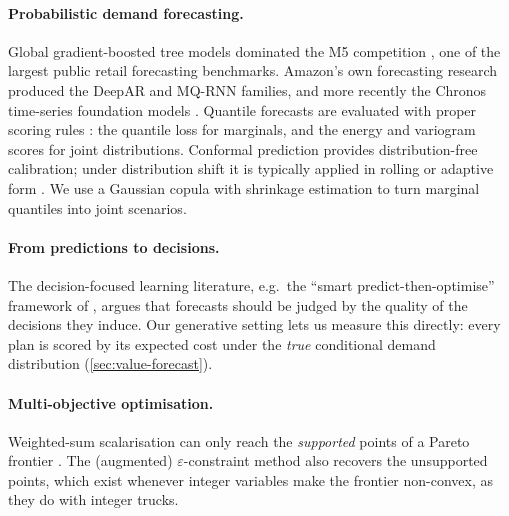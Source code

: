 \paragraph{Probabilistic demand forecasting.}
Global gradient-boosted tree models dominated the M5 competition \citep{makridakis2022}, one of the largest public retail forecasting benchmarks.
Amazon's own forecasting research produced the DeepAR \citep{salinas2020} and MQ-RNN \citep{wen2017} families, and more recently the Chronos time-series foundation models \citep{ansari2024}.
Quantile forecasts are evaluated with proper scoring rules \citep{gneiting2007}: the quantile loss for marginals, and the energy and variogram scores \citep{scheuerer2015} for joint distributions.
Conformal prediction \citep{vovk2005,romano2019} provides distribution-free calibration; under distribution shift it is typically applied in rolling or adaptive form \citep{gibbs2021}.
We use a Gaussian copula \citep{nelsen2006} with shrinkage estimation \citep{ledoit2004} to turn marginal quantiles into joint scenarios.

\paragraph{From predictions to decisions.}
The decision-focused learning literature, e.g.\ the ``smart predict-then-optimise'' framework of \citet{elmachtoub2022}, argues that forecasts should be judged by the quality of the decisions they induce.
Our generative setting lets us measure this directly: every plan is scored by its expected cost under the \emph{true} conditional demand distribution (\cref{sec:value-forecast}).

\paragraph{Multi-objective optimisation.}
Weighted-sum scalarisation can only reach the \emph{supported} points of a Pareto frontier \citep{ehrgott2005}.
The (augmented) $\varepsilon$-constraint method \citep{mavrotas2009,mavrotas2013} also recovers the unsupported points, which exist whenever integer variables make the frontier non-convex, as they do with integer trucks.
